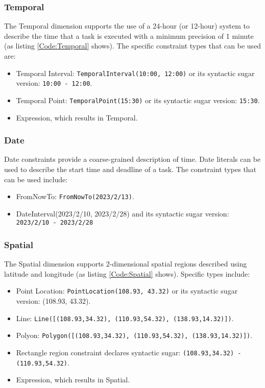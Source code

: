 \subsubsection{Temporal}
The Temporal dimension supports the use of a 24-hour (or 12-hour) system to describe the time that a task is executed with a minimum precision of 1 minute (as listing \ref{Code:Temporal} shows). The specific constraint types that can be used are:
\begin{itemize}
    \item Temporal Interval: \texttt{TemporalInterval(10:00, 12:00)} or its syntactic sugar version: \texttt{10:00 - 12:00}.
    \item Temporal Point: \texttt{TemporalPoint(15:30)} or its syntactic sugar version: \texttt{15:30}.
    \item Expression, which results in Temporal.
\end{itemize}



\subsubsection{Date}
Date constraints provide a coarse-grained description of time. Date literals can be used to describe the start time and deadline of a task. The constraint types that can be used include:
\begin{itemize}
    \item FromNowTo: \texttt{FromNowTo(2023/2/13)}.
    \item DateInterval(2023/2/10, 2023/2/28) and its syntactic sugar version: \texttt{2023/2/10 - 2023/2/28}
\end{itemize}



\subsubsection{Spatial}
The Spatial dimension supports 2-dimensional spatial regions described using latitude and longitude (as listing \ref{Code:Spatial} shows). Specific types include:
\begin{itemize}
    \item Point Location: \texttt{PointLocation(108.93, 43.32)} or its syntactic sugar version: (108.93, 43.32).
    \item Line: \texttt{Line([(108.93,34.32), (110.93,54.32), (138.93,14.32)])}.
    \item Polyon: \texttt{Polygon([(108.93,34.32), (110.93,54.32), (138.93,14.32)])}.
    \item Rectangle region constraint declares syntactic sugar: \texttt{(108.93,34.32) - (110.93,54.32)}.
    \item Expression, which results in Spatial. 
\end{itemize}

